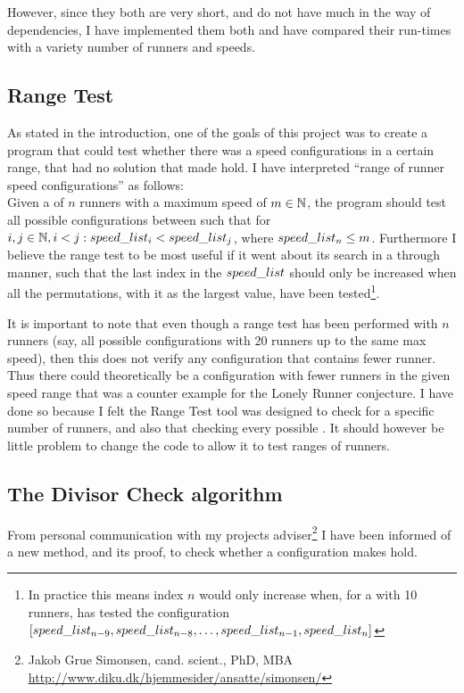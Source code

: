 However, since they both are very short, and do not have much in the way of dependencies, I have implemented them both and have compared their run-times with a variety number of runners and speeds.\\

\subsection{Range Test}
As stated in the introduction, one of the goals of this project was to create a program that could test whether there was a speed configurations in a certain range, that had no solution that made  hold. I have interpreted ``range of runner speed configurations'' as follows:\\

Given a \comS\; of $n$ runners with a maximum speed of $m \in \mathbb{N}$, the program should test all possible configurations between such that for $i, j \in \mathbb{N}, i < j: speed\_list_i < speed\_list_j$, where $speed\_list_n \leq m$. Furthermore I believe the range test to be most useful if it went about its search in a through manner, such that the last index in the $speed\_list$ should only be increased when all the permutations, with it as the largest value, have been tested\footnote{In practice this means index $n$ would only increase when, for a \comS with 10 runners, has tested the configuration $[speed\_list_{n - 9}, speed\_list_{n - 8}, \ldots, speed\_list_{n - 1}, speed\_list_{n}]$}. 

It is important to note that even though a range test has been performed with $n$ runners (say, all possible configurations with 20 runners up to the same max speed), then this does not verify any configuration that contains fewer runner. Thus there could theoretically be a configuration with fewer runners in the given speed range that was a counter example for the Lonely Runner conjecture. I have done so because I felt the Range Test tool was designed to check for a specific number of runners, and also that checking every possible   . It should however be little problem to change the code to allow it to test ranges of runners. 

\subsection{The Divisor Check algorithm}
\label{detect}
From personal communication with my projects adviser\footnote{Jakob Grue Simonsen, cand. scient., PhD, MBA  \underline{http://www.diku.dk/hjemmesider/ansatte/simonsen/}} I have been informed of a new method, and its proof, to check whether a configuration makes  hold. 

